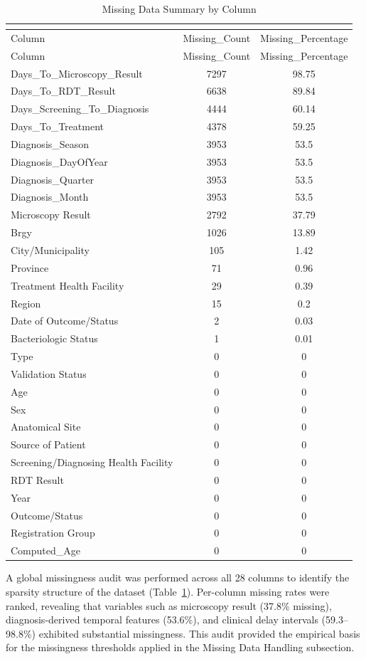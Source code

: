 \documentclass[12pt]{article}
\begin{document}
\small
\begin{longtable}[l]{lcc}
\caption{Missing Data Summary by Column} \\
\label{tab:missing_data_summary} \\
\toprule
Column & Missing\_Count & Missing\_Percentage \\
\midrule
\endfirsthead
\toprule
Column & Missing\_Count & Missing\_Percentage \\
\midrule
\endhead
\midrule
\endfoot
\bottomrule
\endlastfoot
Days\_To\_Microscopy\_Result & 7297 & 98.75 \\
Days\_To\_RDT\_Result & 6638 & 89.84 \\
Days\_Screening\_To\_Diagnosis & 4444 & 60.14 \\
Days\_To\_Treatment & 4378 & 59.25 \\
Diagnosis\_Season & 3953 & 53.5 \\
Diagnosis\_DayOfYear & 3953 & 53.5 \\
Diagnosis\_Quarter & 3953 & 53.5 \\
Diagnosis\_Month & 3953 & 53.5 \\
Microscopy Result & 2792 & 37.79 \\
Brgy & 1026 & 13.89 \\
City/Municipality & 105 & 1.42 \\
Province & 71 & 0.96 \\
Treatment Health Facility & 29 & 0.39 \\
Region & 15 & 0.2 \\
Date of Outcome/Status & 2 & 0.03 \\
Bacteriologic Status & 1 & 0.01 \\
Type & 0 & 0 \\
Validation Status & 0 & 0 \\
Age & 0 & 0 \\
Sex & 0 & 0 \\
Anatomical Site & 0 & 0 \\
Source of Patient & 0 & 0 \\
Screening/Diagnosing Health Facility & 0 & 0 \\
RDT Result & 0 & 0 \\
Year & 0 & 0 \\
Outcome/Status & 0 & 0 \\
Registration Group & 0 & 0 \\
Computed\_Age & 0 & 0 \\
\end{longtable}


A global missingness audit was performed across all 28 columns to identify the sparsity structure of the dataset (Table~\ref{tab:missing_data_summary}). Per-column missing rates were ranked, revealing that variables such as microscopy result (37.8\% missing), diagnosis-derived temporal features (53.6\%), and clinical delay intervals (59.3--98.8\%) exhibited substantial missingness. This audit provided the empirical basis for the missingness thresholds applied in the Missing Data Handling subsection.
\end{document}

